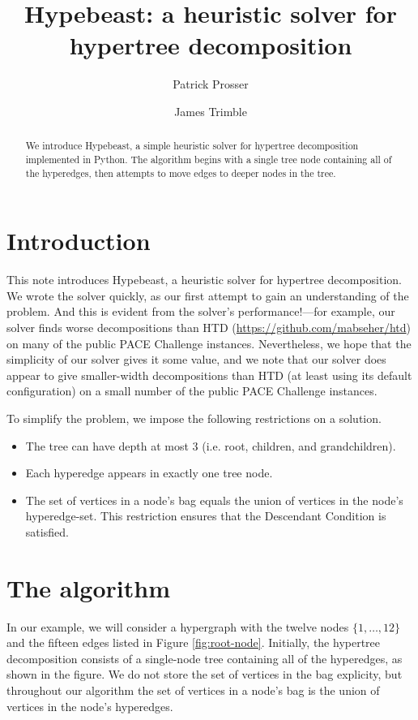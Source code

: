 \documentclass[a4paper,UKenglish,cleveref, autoref]{lipics-v2019}
\title{Hypebeast: a heuristic solver for hypertree decomposition}
\author{Patrick Prosser}{University of Glasgow, Scotland}{patrick.prosser@glasgow.ac.uk}{https://orcid.org/0000-0003-4460-6912}{}
\author{James Trimble}{University of Glasgow, Scotland}{j.trimble.1@research.gla.ac.uk}{https://orcid.org/0000-0001-7282-8745}{}
\begin{document}
\maketitle

\begin{abstract}
We introduce Hypebeast, a simple heuristic solver for hypertree decomposition implemented in Python.  The algorithm begins with a single tree node containing all of the hyperedges, then attempts to move edges to deeper nodes in the tree.
\end{abstract}

\section{Introduction}

This note introduces Hypebeast, a heuristic solver for hypertree decomposition.  We wrote the solver quickly, as our first attempt to gain an understanding of the problem.  And this is evident from the solver's performance!---for example, our solver finds worse decompositions than HTD (\url{https://github.com/mabseher/htd}) on many of the public PACE Challenge instances.  Nevertheless, we hope that the simplicity of our solver gives it some value, and we note that our solver does appear to give smaller-width decompositions than HTD (at least using its default configuration) on a small number of the public PACE Challenge instances.

To simplify the problem, we impose the following restrictions on a solution.
\begin{itemize}
  \item The tree can have depth at most 3 (i.e. root, children, and grandchildren).
  \item Each hyperedge appears in exactly one tree node.
  \item The set of vertices in a node's bag equals the union of vertices in the node's hyperedge-set.  This restriction ensures that the Descendant Condition is satisfied.
\end{itemize}

\section{The algorithm}

In our example, we will consider a hypergraph with the twelve nodes $\{1, \dots, 12\}$ and the fifteen edges listed in Figure \ref{fig:root-node}.  Initially, the hypertree decomposition consists of a single-node tree containing all of the hyperedges, as shown in the figure.  We do not store the set of vertices in the bag explicity, but throughout our algorithm the set of vertices in a node's bag is the union of vertices in the node's hyperedges.
\end{document}
